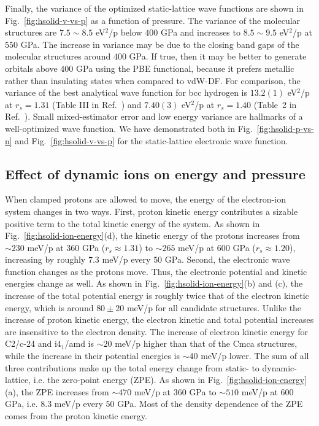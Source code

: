 Finally, the variance of the optimized static-lattice wave functions are shown in Fig.~\ref{fig:hsolid-v-vs-p} as a function of pressure.
The variance of the molecular structures are $7.5\sim8.5$ eV$^2$/p below $400$ GPa and increases to $8.5\sim9.5$ eV$^2$/p at $550$ GPa.
The increase in variance may be due to the closing band gaps of the molecular structures around $400$ GPa.
If true, then it may be better to generate orbitals above $400$ GPa using the PBE functional, because it prefers metallic rather than insulating states when compared to vdW-DF.
For comparison, the variance of the best analytical wave function for bcc hydrogen is $13.2(1)$ eV$^2$/p at $r_s=1.31$ (Table III in Ref.~\cite{Holzmann2003}) and $7.40(3)$ eV$^2$/p at $r_s=1.40$ (Table~2 in Ref.~\cite{Pierleoni2008}).
Small mixed-estimator error and low energy variance are hallmarks of a well-optimized wave function. We have demonstrated both in Fig.~\ref{fig:hsolid-p-vs-n} and Fig.~\ref{fig:hsolid-v-vs-p} for the static-lattice electronic wave function.

\subsection{Effect of dynamic ions on energy and pressure}

When clamped protons are allowed to move, the energy of the electron-ion system changes in two ways.
First, proton kinetic energy contributes a sizable positive term to the total kinetic energy of the system. As shown in Fig.~\ref{fig:hsolid-ion-energy}(d), the kinetic energy of the protons increases from $\sim 230$ meV/p at $360$ GPa ($r_s\approx 1.31$) to $\sim 265$ meV/p at $600$ GPa ($r_s\approx 1.20$), increasing by roughly $7.3$ meV/p every $50$ GPa.
Second, the electronic wave function changes as the protons move. Thus, the electronic potential and kinetic energies change as well.
As shown in Fig.~\ref{fig:hsolid-ion-energy}(b) and (c), the increase of the total potential energy is roughly twice that of the electron kinetic energy, which is around $80\pm20$ meV/p for all candidate structures.
Unlike the increase of proton kinetic energy, the electron kinetic and total potential increases are insensitive to the electron density.
The increase of electron kinetic energy for C2/c-24 and i4$_1$/amd is $\sim 20$ meV/p higher than that of the Cmca structures, while the increase in their potential energies is $\sim 40$ meV/p lower.
The sum of all three contributions make up the total energy change from static- to dynamic-lattice, i.e. the zero-point energy (ZPE).
As shown in Fig.~\ref{fig:hsolid-ion-energy}(a), the ZPE increases from $\sim 470$ meV/p at $360$ GPa to $\sim 510$ meV/p at $600$ GPa, i.e. $8.3$ meV/p every $50$ GPa.
Most of the density dependence of the ZPE comes from the proton kinetic energy.

